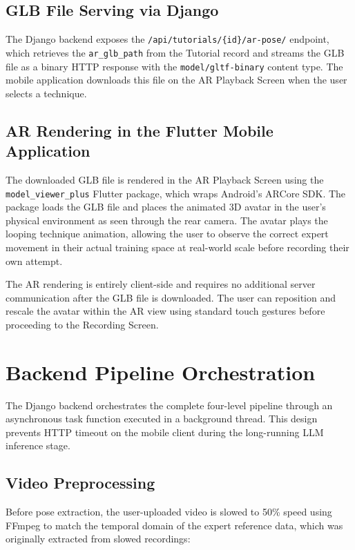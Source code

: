 \begin{sloppypar}
\subsection{GLB File Serving via Django}

The Django backend exposes the \texttt{/api/tutorials/\{id\}/ar-pose/} endpoint, which retrieves the \texttt{ar\_glb\_path} from the Tutorial record and streams the GLB file as a binary HTTP response with the \texttt{model/gltf-binary} content type. The mobile application downloads this file on the AR Playback Screen when the user selects a technique.

\subsection{AR Rendering in the Flutter Mobile Application}

The downloaded GLB file is rendered in the AR Playback Screen using the \texttt{model\_viewer\_plus} Flutter package, which wraps Android's ARCore SDK. The package loads the GLB file and places the animated 3D avatar in the user's physical environment as seen through the rear camera. The avatar plays the looping technique animation, allowing the user to observe the correct expert movement in their actual training space at real-world scale before recording their own attempt.

The AR rendering is entirely client-side and requires no additional server communication after the GLB file is downloaded. The user can reposition and rescale the avatar within the AR view using standard touch gestures before proceeding to the Recording Screen.

\section{Backend Pipeline Orchestration}

The Django backend orchestrates the complete four-level pipeline through an asynchronous task function executed in a background thread. This design prevents HTTP timeout on the mobile client during the long-running LLM inference stage.

\subsection{Video Preprocessing}

Before pose extraction, the user-uploaded video is slowed to 50\% speed using FFmpeg to match the temporal domain of the expert reference data, which was originally extracted from slowed recordings:


\end{sloppypar}
